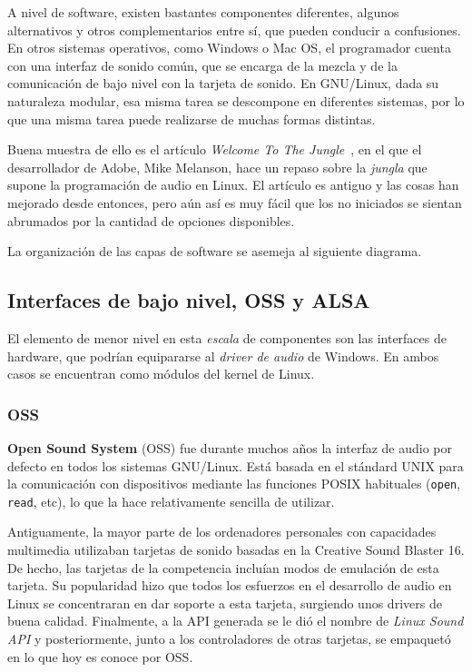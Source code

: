 A nivel de software, existen bastantes componentes diferentes, algunos
alternativos y otros complementarios entre sí, que pueden conducir a
confusiones. En otros sistemas operativos, como Windows o Mac OS, el programador
cuenta con una interfaz de sonido común, que se encarga de la mezcla y de la
comunicación de bajo nivel con la tarjeta de sonido. En GNU/Linux, dada su
naturaleza modular, esa misma tarea se descompone en diferentes sistemas, por lo
que una misma tarea puede realizarse de muchas formas distintas.

Buena muestra de ello es el artículo \textit{Welcome To The Jungle}~\cite{welcomejungle},
en el que el desarrollador de Adobe, Mike Melanson, hace un repaso sobre la
\textit{jungla} que supone la programación de audio en Linux. El artículo es
antiguo y las cosas han mejorado desde entonces, pero aún así es muy fácil que
los no iniciados se sientan abrumados por la cantidad de opciones disponibles.

La organización de las capas de software se asemeja al siguiente diagrama.


\subsection{Interfaces de bajo nivel, OSS y ALSA}
El elemento de menor nivel en esta \textit{escala} de componentes son las
interfaces de hardware, que podrían equipararse al \textit{driver de audio} de
Windows. En ambos casos se encuentran como módulos del kernel de Linux.

\subsubsection{OSS}
\textbf{Open Sound System} (OSS) fue durante muchos años la interfaz de audio
por defecto en todos los sistemas GNU/Linux. Está basada en el stándard UNIX
para la comunicación con dispositivos mediante las funciones POSIX habituales
(\texttt{open}, \texttt{read}, etc), lo que la hace relativamente sencilla de
utilizar.

Antiguamente, la mayor parte de los ordenadores personales con capacidades
multimedia utilizaban tarjetas de sonido basadas en la Creative Sound Blaster
16. De hecho, las tarjetas de la competencia incluían modos de emulación de esta
tarjeta. Su popularidad hizo que todos los esfuerzos en el desarrollo de audio
en Linux se concentraran en dar soporte a esta tarjeta, surgiendo unos drivers
de buena calidad. Finalmente, a la API generada se le dió el nombre de
\textit{Linux Sound API} y posteriormente, junto a los controladores de otras
tarjetas, se empaquetó en lo que hoy es conoce por OSS.

